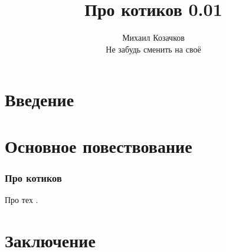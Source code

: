 \documentclass[12pt,oneside,openright,a4paper]{memoir}
\begin{document}
\mainmatter

\title{Про котиков 0.01}
\author{Михаил Козачков\\Не забудь сменить на своё}
\maketitle
\newpage

\renewcommand{\contentsname}{Содержание}
\tableofcontents
\newpage

\part{Введение}

\newpage

\part{Основное повествование}

\section{Про котиков}

Про тех .



\newpage

\part{Заключение}

\printindex
\end{document}
